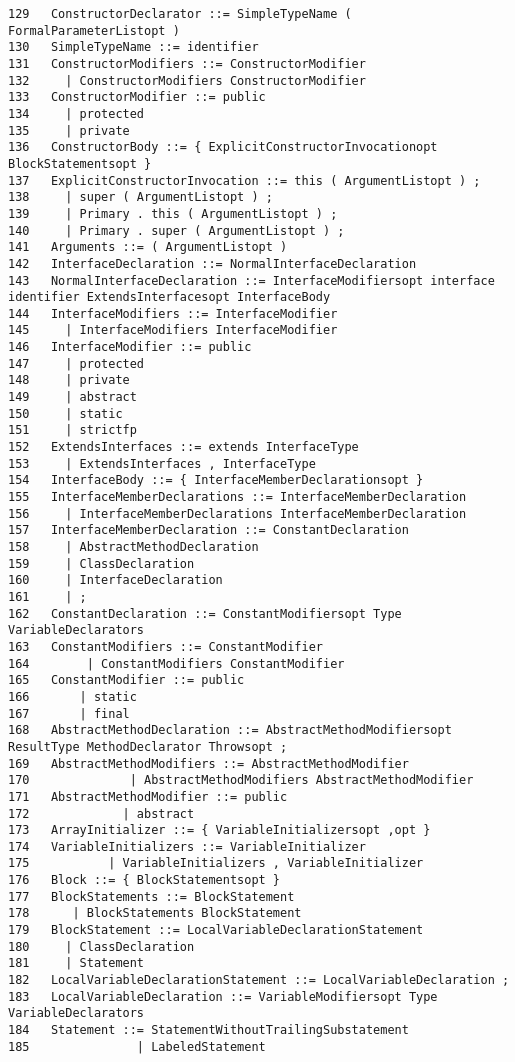 {\begin{verbatim}
129   ConstructorDeclarator ::= SimpleTypeName ( FormalParameterListopt )
130   SimpleTypeName ::= identifier
131   ConstructorModifiers ::= ConstructorModifier
132     | ConstructorModifiers ConstructorModifier
133   ConstructorModifier ::= public
134     | protected
135     | private
136   ConstructorBody ::= { ExplicitConstructorInvocationopt BlockStatementsopt }
137   ExplicitConstructorInvocation ::= this ( ArgumentListopt ) ;
138     | super ( ArgumentListopt ) ;
139     | Primary . this ( ArgumentListopt ) ;
140     | Primary . super ( ArgumentListopt ) ;
141   Arguments ::= ( ArgumentListopt )
142   InterfaceDeclaration ::= NormalInterfaceDeclaration
143   NormalInterfaceDeclaration ::= InterfaceModifiersopt interface identifier ExtendsInterfacesopt InterfaceBody
144   InterfaceModifiers ::= InterfaceModifier
145     | InterfaceModifiers InterfaceModifier
146   InterfaceModifier ::= public
147     | protected
148     | private
149     | abstract
150     | static
151     | strictfp
152   ExtendsInterfaces ::= extends InterfaceType
153     | ExtendsInterfaces , InterfaceType
154   InterfaceBody ::= { InterfaceMemberDeclarationsopt }
155   InterfaceMemberDeclarations ::= InterfaceMemberDeclaration
156     | InterfaceMemberDeclarations InterfaceMemberDeclaration
157   InterfaceMemberDeclaration ::= ConstantDeclaration
158     | AbstractMethodDeclaration
159     | ClassDeclaration
160     | InterfaceDeclaration
161     | ;
162   ConstantDeclaration ::= ConstantModifiersopt Type VariableDeclarators
163   ConstantModifiers ::= ConstantModifier
164        | ConstantModifiers ConstantModifier
165   ConstantModifier ::= public
166       | static
167       | final
168   AbstractMethodDeclaration ::= AbstractMethodModifiersopt ResultType MethodDeclarator Throwsopt ;
169   AbstractMethodModifiers ::= AbstractMethodModifier
170              | AbstractMethodModifiers AbstractMethodModifier
171   AbstractMethodModifier ::= public
172             | abstract
173   ArrayInitializer ::= { VariableInitializersopt ,opt }
174   VariableInitializers ::= VariableInitializer
175           | VariableInitializers , VariableInitializer
176   Block ::= { BlockStatementsopt }
177   BlockStatements ::= BlockStatement
178      | BlockStatements BlockStatement
179   BlockStatement ::= LocalVariableDeclarationStatement
180     | ClassDeclaration
181     | Statement
182   LocalVariableDeclarationStatement ::= LocalVariableDeclaration ;
183   LocalVariableDeclaration ::= VariableModifiersopt Type VariableDeclarators
184   Statement ::= StatementWithoutTrailingSubstatement
185               | LabeledStatement

\end{verbatim}}
